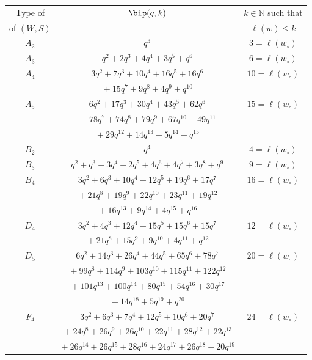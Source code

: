 \documentclass[Unicode]{cedram-alco}
\theoremstyle{definition}
\begin{document}
\begin{table}
\renewcommand\arraystretch{1.25}
\begin{center} 
\begin{tabular}{|c|c|c|}
\hline
Type of   &   $\bip(q,k)$   & $k\in\mathbb N$ such that  \\
of $(W,S)$  & $ $   &$\ell(w)\leq k$  \\
  \hline \hline
  $A_2$& $q^3$&$3=\ell(w_\circ)$\\
  \hline
  $A_3$& $q^2 + 2q^3 + 4q^4 + 3q^5 + q^6$&$6=\ell(w_\circ)$\\
  \hline
  $A_4$& $3q^2 + 7q^3 + 10q^4 + 16q^5 + 16q^6 $&$10=\ell(w_\circ)$\\
  &${}+ 15q^7 + 9q^8 + 4q^9 + q^{10}$& \\
    \hline
  $A_5$& $6q^2 + 17q^3 + 30q^4 + 43q^5 + 62q^6   $&$15=\ell(w_\circ)$\\
  &${}+ 78q^7 + 74q^8 + 79q^9+ 67q^{10} + 49q^{11} $& \\
  &${}+ 29q^{12} + 14q^{13} + 5q^{14} + q^{15}$& \\
 \hline
  $B_2$& $q^4 $&$4=\ell(w_\circ)$\\ 
   \hline
  $B_3$& $q^2 + q^3 + 3q^4 + 2q^5 + 4q^6 + 4q^7 + 3q^8 + q^9 $&$9=\ell(w_\circ)$\\ 
   \hline
  $B_4$& $3q^2 + 6q^3 + 10q^4 + 12q^5 + 19q^6 + 17q^7  $&$16=\ell(w_\circ)$\\ 
    &${}+ 21q^8 + 19q^9 + 22q^{10} + 23q^{11} + 19q^{12} $& \\
        &${}+ 16q^{13} + 9q^{14} + 4q^{15} + q^{16}$& \\
     \hline
  $D_4$& $3q^2 + 4q^3 + 12q^4 + 15q^5 + 15q^6 + 15q^7 $&$12=\ell(w_\circ)$\\
       &${}+ 21q^8 + 15q^9 + 9q^{10} + 4q^{11} + q^{12} $& \\
    \hline
  $D_5$& $ 6q^2 + 14q^3 + 26q^4 + 44q^5 + 65q^6 + 78q^7  $&$20=\ell(w_\circ)$\\
       &${}+ 99q^8 + 114q^9 + 103q^{10} + 115q^{11} + 122q^{12}   $& \\
       &${}+ 101q^{13}  + 100q^{14} + 80q^{15} + 54q^{16} + 30q^{17} $& \\
       &${}+ 14q^{18} + 5q^{19} + q^{20} $& \\
 \hline
  $F_4$& $ 3q^2 + 6q^3 + 7q^4 + 12q^5 + 10q^6 + 20q^7    $&$24=\ell(w_\circ)$\\
       &${} + 24q^8 + 26q^9 + 26q^{10} + 22q^{11} + 28q^{12} + 22q^{13}  $& \\
       &${}+ 26q^{14} + 26q^{15} + 28q^{16} + 24q^{17}+ 26q^{18} + 20q^{19} $&\\

\end{tabular}
\end{center}
\end{table}
\end{document}
